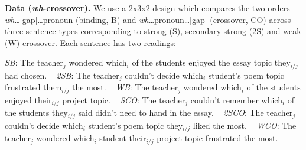 \documentclass[12pt,letterpaper]{article}
\newcommand{\sectitle}[1]{\smallskip \textbf{#1.}}
\begin{document}
\sectitle{Data (\emph{wh}-crossover)}
We use a 2x3x2 design which compares the two orders %
\emph{wh}\ldots{}[gap]\ldots{}pronoun (binding, B) and \emph{wh}\ldots{}pronoun\ldots{}[gap] (crossover, CO) %
across three sentence types corresponding to strong (S), secondary strong (2S) and weak (W) crossover. 
Each sentence has two readings:


\ex \label{ex:s-binding}\textit{SB}: The teacher$_j$ wondered which$_i$ of the students \underline{\hspace{0.5em}} enjoyed the essay topic they$_{i/j}$ had chosen.
\xe
\ex~ \label{ex:2s-binding}\textit{2SB}: The teacher$_j$ couldn't decide which$_i$ student's poem topic \underline{\hspace{0.5em}} frustrated them$_{i/j}$ the most.
\xe
\ex~ \label{ex:w-binding}\textit{WB}: The teacher$_j$ wondered which$_i$ of the students \underline{\hspace{0.5em}} enjoyed their$_{i/j}$ project topic.
\xe
\ex~ \label{ex:s-crossover}\textit{SCO}: The teacher$_j$ couldn't remember which$_i$ of the students they$_{i/j}$ said \underline{\hspace{0.5em}} didn't need to hand in the essay.
\xe
\ex~ \label{ex:2s-crossover}\textit{2SCO}: The teacher$_j$ couldn't decide which$_i$ student's poem topic they$_{i/j}$ liked  \underline{\hspace{0.5em}} the most.
\xe
\ex~ \label{ex:w-crossover}\textit{WCO}: The teacher$_j$ wondered which$_i$ student their$_{i/j}$ project topic frustrated  \underline{\hspace{0.5em}} the most.
\xe

\end{document}
